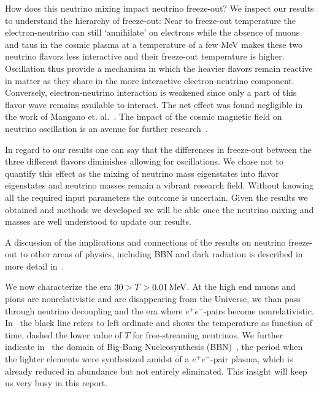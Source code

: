 How does this neutrino mixing impact neutrino freeze-out? We inspect our results to understand the hierarchy of freeze-out: Near to freeze-out temperature the electron-neutrino can still `annihilate' on electrons while the absence of muons and taus in the cosmic plasma at a temperature of a few MeV makes these two neutrino flavors less interactive and their freeze-out temperature is higher. Oscillation thus provide a mechanism in which the heavier flavors remain reactive in matter as they share in the more interactive electron-neutrino component. Conversely, electron-neutrino interaction is weakened since only a part of this flavor wave remains available to interact. The net effect was found negligible in the work of Mangano et. al.~\cite{Mangano:2005cc}. The impact of the cosmic magnetic field on neutrino oscillation is an avenue for further research~\cite{Rafelski:2023zgp}.

In regard to our results one can say that the differences in freeze-out between the three different flavors diminishes allowing for oscillations. We chose not to quantify this effect as the mixing of neutrino mass eigenstates into flavor eigenstates and neutrino masses remain a vibrant research field. Without knowing all the required input parameters the outcome is uncertain. Given the results we obtained and methods we developed we will be able once the neutrino mixing and masses are well understood to update our results. 

A discussion of the implications and connections of the results on neutrino freeze-out to other areas of physics, including BBN and dark radiation is described in more detail in~\cite{Dreiner:2011fp,Boehm:2012gr,Blennow:2012de,Birrell:2014uka}. 

We now characterize the era $30>T>0.01\text{\,MeV}$. At the high end muons and pions are nonrelativistic and are disappearing from the Universe, we than pass through neutrino decoupling and the era where $e^+e^-$-pairs become nonrelativistic. In~ the black line refers to left ordinate and shows the temperature as function of time, dashed the lower value of $T$ for free-streaming neutrinos. We further indicate in~ the domain of Big-Bang Nucleosynthesis (BBN)~\cite{Iocco:2008va}, the period when the lighter elements were synthesized amidst of a $e^+e^-$-pair plasma, which is already reduced in abundance but not entirely eliminated. This insight will keep us very busy in this report. 


